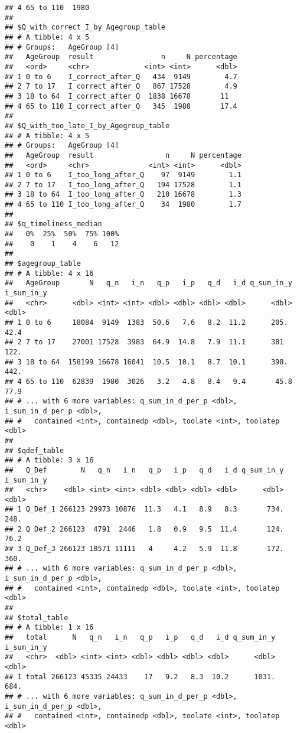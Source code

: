 \documentclass[
]{article}
\begin{document}
\begin{verbatim}
## 4 65 to 110  1980
## 
## $Q_with_correct_I_by_Agegroup_table
## # A tibble: 4 x 5
## # Groups:   AgeGroup [4]
##   AgeGroup  result                n     N percentage
##   <ord>     <chr>             <int> <int>      <dbl>
## 1 0 to 6    I_correct_after_Q   434  9149        4.7
## 2 7 to 17   I_correct_after_Q   867 17528        4.9
## 3 18 to 64  I_correct_after_Q  1838 16678       11  
## 4 65 to 110 I_correct_after_Q   345  1980       17.4
## 
## $Q_with_too_late_I_by_Agegroup_table
## # A tibble: 4 x 5
## # Groups:   AgeGroup [4]
##   AgeGroup  result                 n     N percentage
##   <ord>     <chr>              <int> <int>      <dbl>
## 1 0 to 6    I_too_long_after_Q    97  9149        1.1
## 2 7 to 17   I_too_long_after_Q   194 17528        1.1
## 3 18 to 64  I_too_long_after_Q   210 16678        1.3
## 4 65 to 110 I_too_long_after_Q    34  1980        1.7
## 
## $q_timeliness_median
##   0%  25%  50%  75% 100% 
##    0    1    4    6   12 
## 
## $agegroup_table
## # A tibble: 4 x 16
##   AgeGroup       N   q_n   i_n   q_p   i_p   q_d   i_d q_sum_in_y i_sum_in_y
##   <chr>      <dbl> <int> <int> <dbl> <dbl> <dbl> <dbl>      <dbl>      <dbl>
## 1 0 to 6     18084  9149  1383  50.6   7.6   8.2  11.2      205.        42.4
## 2 7 to 17    27001 17528  3983  64.9  14.8   7.9  11.1      381        122. 
## 3 18 to 64  158199 16678 16041  10.5  10.1   8.7  10.1      398.       442. 
## 4 65 to 110  62839  1980  3026   3.2   4.8   8.4   9.4       45.8       77.9
## # ... with 6 more variables: q_sum_in_d_per_p <dbl>, i_sum_in_d_per_p <dbl>,
## #   contained <int>, containedp <dbl>, toolate <int>, toolatep <dbl>
## 
## $qdef_table
## # A tibble: 3 x 16
##   Q_Def        N   q_n   i_n   q_p   i_p   q_d   i_d q_sum_in_y i_sum_in_y
##   <chr>    <dbl> <int> <int> <dbl> <dbl> <dbl> <dbl>      <dbl>      <dbl>
## 1 Q_Def_1 266123 29973 10876  11.3   4.1   8.9   8.3       734.      248. 
## 2 Q_Def_2 266123  4791  2446   1.8   0.9   9.5  11.4       124.       76.2
## 3 Q_Def_3 266123 10571 11111   4     4.2   5.9  11.8       172.      360. 
## # ... with 6 more variables: q_sum_in_d_per_p <dbl>, i_sum_in_d_per_p <dbl>,
## #   contained <int>, containedp <dbl>, toolate <int>, toolatep <dbl>
## 
## $total_table
## # A tibble: 1 x 16
##   total      N   q_n   i_n   q_p   i_p   q_d   i_d q_sum_in_y i_sum_in_y
##   <chr>  <dbl> <int> <int> <dbl> <dbl> <dbl> <dbl>      <dbl>      <dbl>
## 1 total 266123 45335 24433    17   9.2   8.3  10.2      1031.       684.
## # ... with 6 more variables: q_sum_in_d_per_p <dbl>, i_sum_in_d_per_p <dbl>,
## #   contained <int>, containedp <dbl>, toolate <int>, toolatep <dbl>
\end{verbatim}
\end{document}
